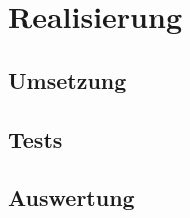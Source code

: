 \chapter{Realisierung}

\label{ReportRealisierung}

\section{Umsetzung}

\section{Tests}

\section{Auswertung}
